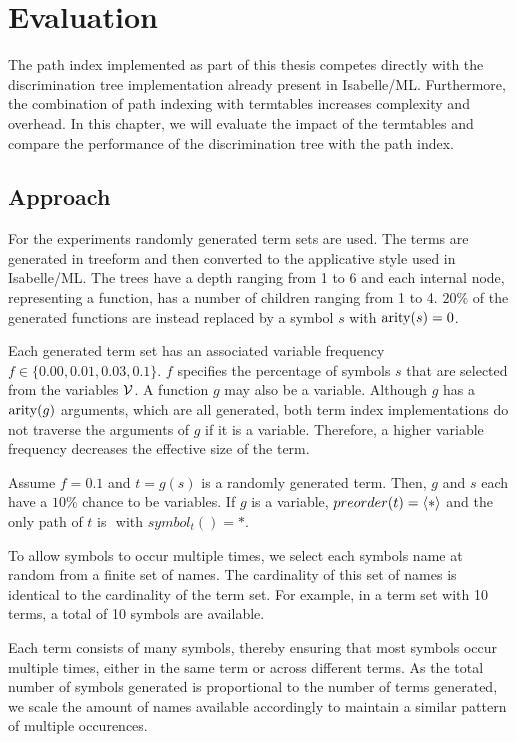 \chapter{Evaluation} \label{evaluation}
The path index implemented as part of this thesis competes directly with the discrimination tree implementation already present in Isabelle/ML. Furthermore, the combination of path indexing with termtables increases complexity and overhead. In this chapter, we will evaluate the impact of the termtables and compare the performance of the discrimination tree with the path index.

\section{Approach} \label{approach}
For the experiments randomly generated term sets are used. The terms are generated in treeform and then converted to the applicative style used in Isabelle/ML. The trees have a depth ranging from 1 to 6 and each internal node, representing a function, has a number of children ranging from 1 to 4. $20\%$ of the generated functions are instead replaced by a symbol $s$ with $\mathrm{arity} (s) = 0$.

Each generated term set has an associated variable frequency $f \in \{0.00, 0.01, 0.03, 0.1\}$. $f$ specifies the percentage of symbols $s$ that are selected from the variables $\mathcal{V}$. A function $g$ may also be a variable. Although $g$ has a $\mathrm{arity}(g)$ arguments, which are all generated, both term index implementations do not traverse the arguments of $g$ if it is a variable. Therefore, a higher variable frequency decreases the effective size of the term.

\begin{exmpl}
  Assume $f = 0.1$ and $t = g(s)$ is a randomly generated term. Then, $g$ and $s$ each have a $10\%$ chance to be variables. If $g$ is a variable, $preorder(t) = \langle * \rangle$ and the only path of $t$ is $\ang{}$ with $symbol_{t}(\ang{}) = *$.
\end{exmpl}

To allow symbols to occur multiple times, we select each symbols name at random from a finite set of names. The cardinality of this set of names is identical to the cardinality of the term set. For example, in a term set with 10 terms, a total of 10 symbols are available.

Each term consists of many symbols, thereby ensuring that most symbols occur multiple times, either in the same term or across different terms. As the total number of symbols generated is proportional to the number of terms generated, we scale the amount of names available accordingly to maintain a similar pattern of multiple occurences.

